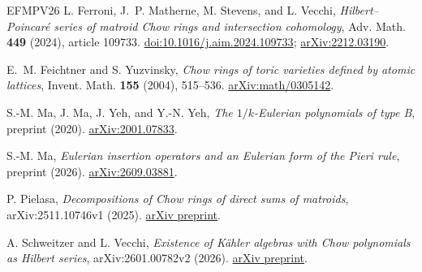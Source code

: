 \documentclass[12pt]{amsart}
\theoremstyle{definition}
\theoremstyle{remark}
\numberwithin{equation}{section}
\begin{document}
\begin{thebibliography}{EFMPV26}
L. Ferroni, J.~P. Matherne, M. Stevens, and L. Vecchi,
\emph{Hilbert--Poincar\'e series of matroid Chow rings and intersection cohomology},
Adv. Math. \textbf{449} (2024), article 109733.
\href{https://doi.org/10.1016/j.aim.2024.109733}{doi:10.1016/j.aim.2024.109733};
\href{https://arxiv.org/abs/2212.03190}{arXiv:2212.03190}.

E.~M. Feichtner and S. Yuzvinsky,
\emph{Chow rings of toric varieties defined by atomic lattices},
Invent. Math. \textbf{155} (2004), 515--536.
\href{https://arxiv.org/abs/math/0305142}{arXiv:math/0305142}.

S.-M. Ma, J. Ma, J. Yeh, and Y.-N. Yeh,
\emph{The $1/k$-Eulerian polynomials of type B}, preprint (2020).
\href{https://arxiv.org/abs/2001.07833}{arXiv:2001.07833}.

S.-M. Ma, \emph{Eulerian insertion operators and an Eulerian form of the Pieri rule},
preprint (2026).
\href{https://arxiv.org/abs/2609.03881}{arXiv:2609.03881}.

P. Pielasa,
\emph{Decompositions of Chow rings of direct sums of matroids},
arXiv:2511.10746v1 (2025).
\href{https://arxiv.org/abs/2511.10746}{arXiv preprint}.

A. Schweitzer and L. Vecchi,
\emph{Existence of K\"ahler algebras with Chow polynomials as Hilbert series},
arXiv:2601.00782v2 (2026).
\href{https://arxiv.org/abs/2601.00782}{arXiv preprint}.
\end{thebibliography}
\end{document}
